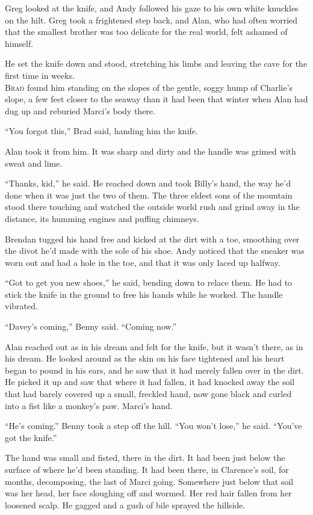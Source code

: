Greg looked at the knife, and Andy followed his gaze to his own white
knuckles on the hilt.  Greg took a frightened step back, and Alan, who
had often worried that the smallest brother was too delicate for the
real world, felt ashamed of himself.

He set the knife down and stood, stretching his limbs and leaving the
cave for the first time in weeks.
\\
\lettrine[lines=3, lhang=.5, nindent=0pt, findent=2pt]{B}{rad} found him standing on the slopes of the gentle, soggy hump of
Charlie's slope, a few feet closer to the seaway than it had been that
winter when Alan had dug up and reburied Marci's body there.

``You forgot this,'' Brad said, handing him the knife.

Alan took it from him.  It was sharp and dirty and the handle was
grimed with sweat and lime.

``Thanks, kid,'' he said.  He reached down and took Billy's hand, the
way he'd done when it was just the two of them.  The three eldest sons
of the mountain stood there touching and watched the outside world
rush and grind away in the distance, its humming engines and puffing
chimneys.

Brendan tugged his hand free and kicked at the dirt with a toe,
smoothing over the divot he'd made with the sole of his shoe.  Andy
noticed that the sneaker was worn out and had a hole in the toe, and
that it was only laced up halfway.

``Got to get you new shoes,'' he said, bending down to relace them. 
He had to stick the knife in the ground to free his hands while he
worked.  The handle vibrated.

``Davey's coming,'' Benny said.  ``Coming now.''

Alan reached out as in his dream and felt for the knife, but it wasn't
there, as in his dream.  He looked around as the skin on his face
tightened and his heart began to pound in his ears, and he saw that it
had merely fallen over in the dirt.  He picked it up and saw that
where it had fallen, it had knocked away the soil that had barely
covered up a small, freckled hand, now gone black and curled into a
fist like a monkey's paw.  Marci's hand.

``He's coming.'' Benny took a step off the hill.  ``You won't lose,''
he said.  ``You've got the knife.''

The hand was small and fisted, there in the dirt.  It had been just
below the surface of where he'd been standing.  It had been there, in
Clarence's soil, for months, decomposing, the last of Marci going. 
Somewhere just below that soil was her head, her face sloughing off
and wormed.  Her red hair fallen from her loosened scalp.  He gagged
and a gush of bile sprayed the hillside.

